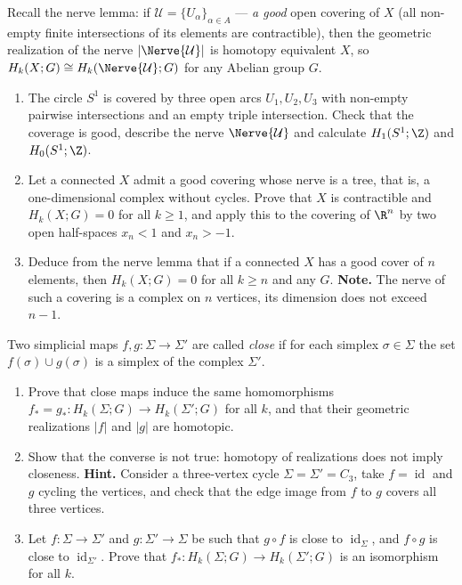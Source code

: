 \documentclass[a4paper,12pt]{report}
\begin{document}
\begin{task}
Recall the nerve lemma\textup{:} if $\mathcal U = \{U_\alpha\}_{\alpha \in A}$ --- \emph{a good} open covering of $X$ \textup{(}all non-empty finite intersections of its elements are contractible\textup{)}, then the geometric realization of the nerve $|\Nerve{\mathcal U}|$ is homotopy equivalent $X$, so $H_k(X; G) \cong H_k(\Nerve{\mathcal U}; G)$ for any Abelian group $G$.
\begin{enumerate}[label=\textup{(\alph*)}]
\item The circle $S^1$ is covered by three open arcs $U_1, U_2, U_3$ with non-empty pairwise intersections and an empty triple intersection. Check that the coverage is good, describe the nerve $\Nerve{\mathcal U}$ and calculate $H_1(S^1; \Z)$ and $H_0(S^1; \Z)$.
\item Let a connected $X$ admit a good covering whose nerve is a tree, that is, a one-dimensional complex without cycles. Prove that $X$ is contractible and $H_k(X; G) = 0$ for all $k \ge 1$, and apply this to the covering of $\R^n$ by two open half-spaces $x_n < 1$ and $x_n > -1$.
\item Deduce from the nerve lemma that if a connected $X$ has a good cover of $n$ elements, then $H_k(X; G) = 0$ for all $k \ge n$ and any $G$. \textbf{Note.} The nerve of such a covering is a complex on $n$ vertices, its dimension does not exceed $n - 1$.
\end{enumerate}
\end{task}

\begin{task}
Two simplicial maps $f, g \colon \Sigma \to \Sigma'$ are called \emph{close} if for each simplex $\sigma \in \Sigma$ the set $f(\sigma) \cup g(\sigma)$ is a simplex of the complex $\Sigma'$.
\begin{enumerate}[label=\textup{(\alph*)}]
\item Prove that close maps induce the same homomorphisms $f_* = g_* \colon H_k(\Sigma; G) \to H_k(\Sigma'; G)$ for all $k$, and that their geometric realizations $|f|$ and $|g|$ are homotopic.
\item Show that the converse is not true\textup{:} homotopy of realizations does not imply closeness. \textbf{Hint.} Consider a three-vertex cycle $\Sigma = \Sigma' = C_3$, take $f = \operatorname{id}$ and $g$ cycling the vertices, and check that the edge image from $f$ to $g$ covers all three vertices.
\item Let $f \colon \Sigma \to \Sigma'$ and $g \colon \Sigma' \to \Sigma$ be such that $g \circ f$ is close to $\operatorname{id}_\Sigma$, and $f \circ g$ is close to $\operatorname{id}_{\Sigma'}$. Prove that $f_* \colon H_k(\Sigma; G) \to H_k(\Sigma'; G)$ is an isomorphism for all $k$.
\end{enumerate}
\end{task}
\end{document}
